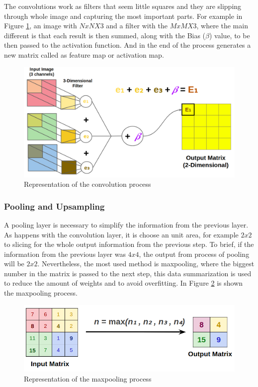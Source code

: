 The convolutions work as filters that seem little squares and they are slipping through whole image and capturing the most important parts. For example in Figure \ref{fig:bias}, an image with $NxNX3$ and a filter with the $MxMX3$, where the main different is that each result is then summed, along with the Bias ($\beta$) value, to be then passed to the activation function. And in the end of the process generates a new matrix called as feature map or activation map.


\begin{figure}[H]
\centering
\includegraphics[scale=0.35]{imagens/three_dim_conv_2.png}
\caption{Representation of the convolution process}
\label{fig:bias}
\end{figure}




\subsubsection{Pooling and Upsampling}\label{sub:pooling}

A pooling layer is necessary to simplify the information from the previous layer. As happens with the convolution layer, it is choose an unit area, for example $2x2$ to slicing for the whole output information from the previous step. To brief, if the information from the previous layer was $4x4$, the output from process of pooling will be $2x2$. Nevertheless, the most used method is maxpooling, where the biggest number in the matrix is passed to the next step, this data summarization is used to reduce the amount of weights and to avoid overfitting. In Figure \ref{fig:pooling} is shown the maxpooling process.

\begin{figure}[H]
\centering
\includegraphics[scale=0.35]{imagens/max_pooling.png}
\caption{Representation of the maxpooling process}
\label{fig:pooling}
\end{figure}




